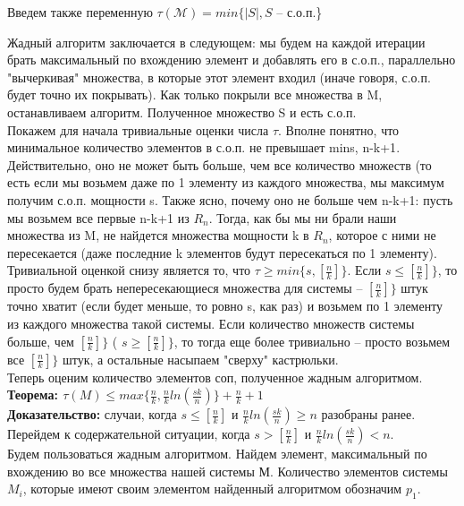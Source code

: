 \documentclass[12pt]{article}
\begin{document}
Введем также переменную \(\tau(\mathcal{M}) = min\{|S|, S \) -- с.о.п.\}

Жадный алгоритм заключается в следующем: мы будем на каждой итерации брать максимальный по вхождению элемент и добавлять его в с.о.п., параллельно "вычеркивая" множества, в которые этот элемент входил (иначе говоря, с.о.п. будет точно их покрывать). Как только покрыли все множества в M, останавливаем алгоритм. Полученное множество S и есть с.о.п.\\

Покажем для начала тривиальные оценки числа \(\tau\).
Вполне понятно, что минимальное количество элементов в с.о.п. не превышает min{s, n-k+1}. Действительно, оно не может быть больше, чем все количество множеств (то есть если мы возьмем даже по 1 элементу из каждого множества, мы максимум получим с.о.п. мощности s. Также ясно, почему оно не больше чем n-k+1: пусть мы возьмем все первые n-k+1 из \(R_n\). Тогда, как бы мы ни брали наши множества из M, не найдется множества мощности k в \(R_n\), которое с ними не пересекается (даже последние k элементов будут пересекаться по 1 элементу). \\

Тривиальной оценкой снизу является то, что \(\tau \geq min\{s, [\frac{n}{k}]\}\). Если \(s \leq [\frac{n}{k}]\}\), то просто будем брать непересекающиеся множества для системы -- \([\frac{n}{k}]\}\) штук точно хватит (если будет меньше, то ровно s, как раз) и возьмем по 1 элементу из каждого множества такой системы. Если количество множеств системы больше, чем  \([\frac{n}{k}]\}\) ( \(s \geq [\frac{n}{k}]\}\), то тогда еще более тривиально -- просто возьмем все \([\frac{n}{k}]\}\) штук, а остальные насыпаем "сверху" кастрюльки.\\

Теперь оценим количество элементов соп, полученное жадным алгоритмом.\\

\textbf{Теорема: \(\tau(M) \leq max\{\frac{n}{k}, \frac{n}{k}ln(\frac{sk}{n})\} + \frac{n}{k} + 1\)} \\

\textbf{Доказательство:} случаи, когда \(s \leq [\frac{n}{k}]\) и \(\frac{n}{k}ln(\frac{sk}{n}) \geq n\) разобраны ранее.\\

Перейдем к содержательной ситуации, когда \(s > [\frac{n}{k}]\) и \(\frac{n}{k}ln(\frac{sk}{n}) < n\).\\

Будем пользоваться жадным алгоритмом. Найдем элемент, максимальный по вхождению во все множества нашей системы М. Количество элементов системы \(M_i\), которые имеют своим элементом найденный алгоритмом обозначим \(p_1\). \\
\end{document}
